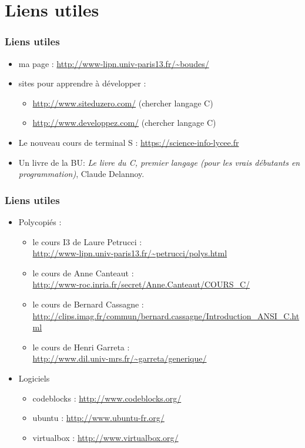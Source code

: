 \documentclass[xcolor=svgnames]{beamer}
\begin{document}
\section[Références]{Liens utiles}
\begin{frame}
\frametitle{Liens utiles\nowrite}

  \begin{itemize} 
\item ma page : \url{http://www-lipn.univ-paris13.fr/~boudes/}
\item sites pour apprendre à développer :
  \begin{itemize}
  \item \url{http://www.siteduzero.com/} (chercher langage C)
  \item \url{http://www.developpez.com/} (chercher langage C)
  \end{itemize}
\item Le nouveau cours de terminal S :
  \url{https://science-info-lycee.fr}
\item Un livre de la BU: \emph{Le livre du C, premier langage (pour les
  vrais débutants en programmation)}, Claude Delannoy.
  \end{itemize} 
\end{frame}

\begin{frame}
\frametitle{Liens utiles\nowrite}
\begin{itemize} 
\item Polycopiés :
  \begin{itemize}
  \item le cours I3 de Laure Petrucci :\\
    {\small\url{http://www-lipn.univ-paris13.fr/~petrucci/polys.html}}
  \item le cours de Anne Canteaut :\\
    {\small\url{http://www-roc.inria.fr/secret/Anne.Canteaut/COURS_C/}}
  \item le cours de Bernard Cassagne :\\
    {\small\url{http://clips.imag.fr/commun/bernard.cassagne/Introduction_ANSI_C.html}}
  \item le cours de Henri Garreta : \\
    {\small\url{http://www.dil.univ-mrs.fr/~garreta/generique/}}
  \end{itemize}
\item Logiciels
  \begin{itemize}
  \item codeblocks : \url{http://www.codeblocks.org/}
  \item ubuntu : \url{http://www.ubuntu-fr.org/}
  \item virtualbox : \url{http://www.virtualbox.org/}
  \end{itemize}
  \end{itemize} 
\end{frame}
\end{document}

